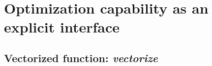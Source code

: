 \section{Optimization capability as an explicit interface}

\subsection{Vectorized function: \textit{\textbf{vectorize}}}
